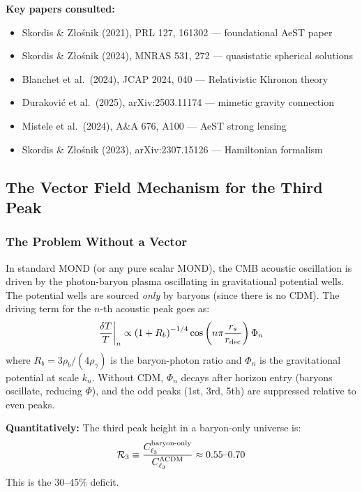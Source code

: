 \documentclass[11pt,a4paper]{article}
\begin{document}
\textbf{Key papers consulted:}
\begin{itemize}
\item Skordis \& Z{\l}o\'{s}nik (2021), PRL 127, 161302 --- foundational AeST paper
\item Skordis \& Z{\l}o\'{s}nik (2024), MNRAS 531, 272 --- quasistatic spherical solutions
\item Blanchet et al.\ (2024), JCAP 2024, 040 --- Relativistic Khronon theory
\item Durakovi\'{c} et al.\ (2025), arXiv:2503.11174 --- mimetic gravity connection
\item Mistele et al.\ (2024), A\&A 676, A100 --- AeST strong lensing
\item Skordis \& Z{\l}o\'{s}nik (2023), arXiv:2307.15126 --- Hamiltonian formalism
\end{itemize}

\subsection{The Vector Field Mechanism for the Third Peak}

\subsubsection{The Problem Without a Vector}

In standard MOND (or any pure scalar MOND), the CMB acoustic oscillation is driven by the photon-baryon plasma oscillating in gravitational potential wells. The potential wells are sourced \emph{only} by baryons (since there is no CDM). The driving term for the $n$-th acoustic peak goes as:
\begin{equation}
\frac{\delta T}{T}\bigg|_n \propto \left(1 + R_b\right)^{-1/4}\cos\left(n\pi\frac{r_s}{r_{\rm dec}}\right)\Phi_n
\end{equation}
where $R_b = 3\rho_b/(4\rho_\gamma)$ is the baryon-photon ratio and $\Phi_n$ is the gravitational potential at scale $k_n$. Without CDM, $\Phi_n$ decays after horizon entry (baryons oscillate, reducing $\Phi$), and the odd peaks (1st, 3rd, 5th) are suppressed relative to even peaks.

\textbf{Quantitatively:} The third peak height in a baryon-only universe is:
\begin{equation}
\mathcal{R}_3 \equiv \frac{C_{\ell_3}^{\rm baryon\text{-}only}}{C_{\ell_3}^{\rm \Lambda CDM}} \approx 0.55\text{--}0.70
\end{equation}
This is the 30--45\% deficit.
\end{document}
